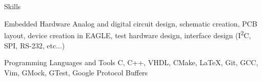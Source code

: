 

\section{\faToolbox}{Skills}

 \resumeEntryStart
  \resumeEntryS
	{Embedded Hardware}
	{
	 Analog and digital circuit design, schematic creation, PCB layout,
	 device creation in EAGLE, test hardware design, interface design
	 (I\textsuperscript{2}C, SPI, RS-232, etc...)
	}

  \resumeEntryS
	{Programming Languages and Tools}
	{
	 C, C++, VHDL, CMake, \LaTeX, Git, GCC, Vim, GMock, GTest,
	 Google Protocol Buffers
	}

  \vspace{5pt}

 \resumeEntryEnd
